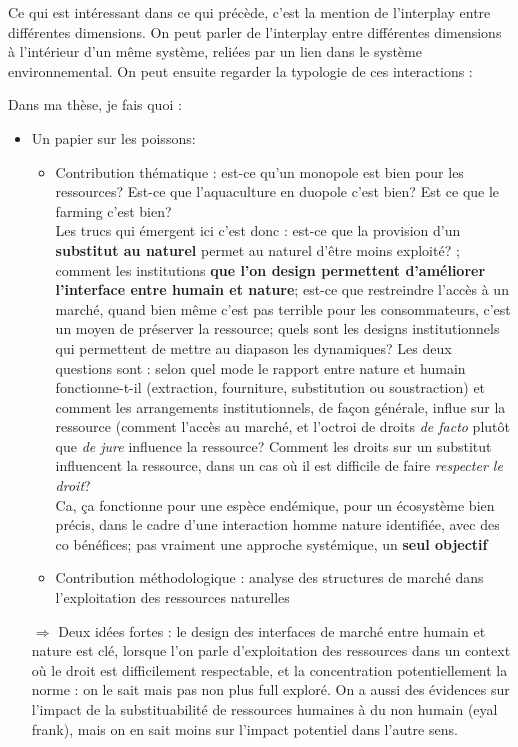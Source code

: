 

\clearpage
Ce qui est intéressant dans ce qui précède, c'est la mention de l'interplay entre différentes dimensions. 
On peut parler de l'interplay entre différentes dimensions à l'intérieur d'un même système, reliées par un lien dans le système environnemental. 
On peut ensuite regarder la typologie de ces interactions : 


Dans ma thèse, je fais quoi : 
\begin{itemize}
\item Un papier sur les poissons:
\begin{itemize}
\item Contribution thématique : est-ce qu'un monopole est bien pour les ressources? Est-ce que l'aquaculture en duopole c'est bien? Est ce que le farming c'est bien? 
\\
Les trucs qui émergent ici c'est donc : est-ce que la provision d'un\textbf{ substitut au naturel} permet au naturel d'être moins exploité? ; comment les institutions \textbf{que l'on design permettent d'améliorer l'interface entre humain et nature}; est-ce que restreindre l'accès à un marché, quand bien même c'est pas terrible pour les consommateurs, c'est un moyen de préserver la ressource; quels sont les designs institutionnels qui permettent de mettre au diapason les dynamiques? Les deux questions sont : selon quel mode le rapport entre nature et humain fonctionne-t-il (extraction, fourniture, substitution ou soustraction) et comment les arrangements institutionnels, de façon générale, influe sur la ressource (comment l'accès au marché, et l'octroi de droits \textit{de facto} plutôt que \textit{de jure} influence la ressource? Comment les droits sur un substitut influencent la ressource, dans un cas où il est difficile de faire \textit{respecter le droit}?
\\
Ca, ça fonctionne pour une espèce endémique, pour un écosystème bien précis, dans le cadre d'une interaction homme nature identifiée, avec des co bénéfices; pas vraiment une approche systémique, un \textbf{seul objectif}
\item Contribution méthodologique : analyse des structures de marché dans l'exploitation des ressources naturelles
\end{itemize}
$\Rightarrow$ Deux idées fortes : le design des interfaces de marché entre humain et nature est clé, lorsque l'on parle d'exploitation des ressources dans un context où le droit est difficilement respectable, et la concentration potentiellement la norme : on le sait mais pas non plus full exploré. On a aussi des évidences sur l'impact de la substituabilité de ressources humaines à du non humain (eyal frank), mais on en sait moins sur l'impact potentiel dans l'autre sens. 



\end{itemize}
